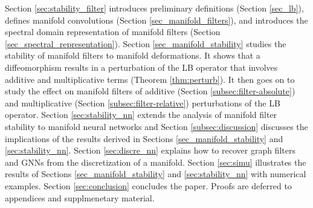 
 Section \ref{sec:stability_filter} introduces preliminary definitions (Section \ref{sec_lb}), defines manifold convolutions (Section \ref{sec_manifold_filters}), and introduces the spectral domain representation of manifold filters (Section \ref{sec_spectral_representation}). Section \ref{sec_manifold_stability} studies the stability of manifold filters to manifold deformations. It shows that a diffeomorphism results in a perturbation of the LB operator that involves additive and multiplicative terms (Theorem \ref{thm:perturb}). It then goes on to study the effect on manifold filters of additive (Section \ref{subsec:filter-absolute}) and multiplicative (Section \ref{subsec:filter-relative}) perturbations of the LB operator. Section \ref{sec:stability_nn} extends the analysis of manifold filter stability to manifold neural networks and Section \ref{subsec:discussion} discusses the implications of the results derived in Sections \ref{sec_manifold_stability} and \ref{sec:stability_nn}. Section \ref{sec:discre_nn} explains how to recover graph filters and GNNs from the discretization of a manifold. Section \ref{sec:simu} illustrates the results of Sections \ref{sec_manifold_stability} and \ref{sec:stability_nn} with numerical examples. Section \ref{sec:conclusion} concludes the paper. Proofs are deferred to appendices and supplmenetary material.
